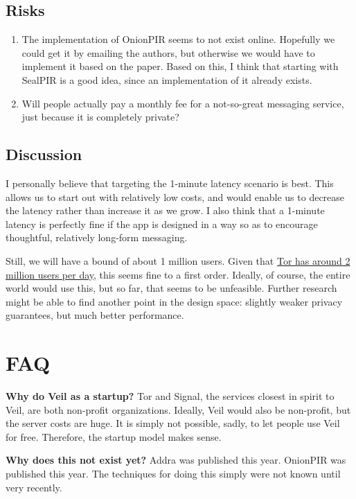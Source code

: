 \documentclass[sigconf, nonacm, balance=false, natbib=false, screen]{acmart}
\begin{document}
\subsection{Risks}

\begin{enumerate}
  \item The implementation of OnionPIR seems to not exist online. Hopefully we could get it by emailing the authors, but otherwise we would have to implement it based on the paper. Based on this, I think that starting with SealPIR is a good idea, since an implementation of it already exists.
  \item Will people actually pay a monthly fee for a not-so-great messaging service, just because it is completely private?
\end{enumerate}

\subsection{Discussion}

I personally believe that targeting the 1-minute latency scenario is best. This allows us to start out with relatively low costs, and would enable us to decrease the latency rather than increase it as we grow. I also think that a 1-minute latency is perfectly fine if the app is designed in a way so as to encourage thoughtful, relatively long-form messaging.

Still, we will have a bound of about 1 million users. Given that \href{https://metrics.torproject.org/userstats-relay-country.html}{Tor has around 2 million users per day}, this seems fine to a first order. Ideally, of course, the entire world would use this, but so far, that seems to be unfeasible. Further research might be able to find another point in the design space: slightly weaker privacy guarantees, but much better performance.

\section{FAQ}

\textbf{Why do Veil as a startup?} Tor and Signal, the services closest in spirit to Veil, are both non-profit organizations. Ideally, Veil would also be non-profit, but the server costs are huge. It is simply not possible, sadly, to let people use Veil for free. Therefore, the startup model makes sense.

\textbf{Why does this not exist yet?} Addra was published this year. OnionPIR was published this year. The techniques for doing this simply were not known until very recently.

\printbibliography
\end{document}
